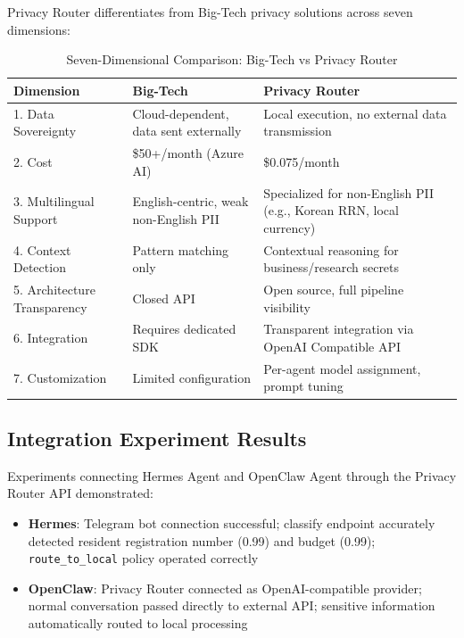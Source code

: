 \documentclass[11pt,a4paper]{article}
\begin{document}
Privacy Router differentiates from Big-Tech privacy solutions across seven dimensions:

\begin{table}[h]
\centering
\begin{tabular}{@{}p{2.5cm}p{4cm}p{4cm}@{}}
\toprule
Dimension & Big-Tech & Privacy Router \\
\midrule
1. Data Sovereignty & Cloud-dependent, data sent externally & Local execution, no external data transmission \\
2. Cost & \$50+/month (Azure AI) & \$0.075/month \\
3. Multilingual Support & English-centric, weak non-English PII & Specialized for non-English PII (e.g., Korean RRN, local currency) \\
4. Context Detection & Pattern matching only & Contextual reasoning for business/research secrets \\
5. Architecture Transparency & Closed API & Open source, full pipeline visibility \\
6. Integration & Requires dedicated SDK & Transparent integration via OpenAI Compatible API \\
7. Customization & Limited configuration & Per-agent model assignment, prompt tuning \\
\bottomrule
\end{tabular}
\caption{Seven-Dimensional Comparison: Big-Tech vs Privacy Router}
\end{table}

\subsection{Integration Experiment Results}

Experiments connecting Hermes Agent and OpenClaw Agent through the Privacy Router API demonstrated:

\begin{itemize}[nosep]
  \item \textbf{Hermes}: Telegram bot connection successful; classify endpoint accurately detected resident registration number (0.99) and budget (0.99); \texttt{route\_to_local} policy operated correctly
  \item \textbf{OpenClaw}: Privacy Router connected as OpenAI-compatible provider; normal conversation passed directly to external API; sensitive information automatically routed to local processing
\end{itemize}

\end{document}
